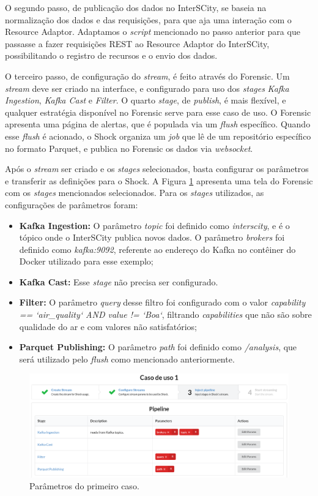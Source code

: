 O segundo passo, de publicação dos dados no InterSCity, se baseia na
normalização dos dados e das requisições, para que aja uma interação com o
Resource Adaptor. Adaptamos o \textit{script} mencionado no passo anterior
para que passasse a fazer requisições REST ao Resource Adaptor do InterSCity,
possibilitando o registro de recursos e o envio dos dados.

O terceiro passo, de configuração do \textit{stream}, é feito através do Forensic.
Um \textit{stream} deve ser criado na interface, e configurado para uso dos
\textit{stages} \textit{Kafka Ingestion}, \textit{Kafka Cast} e \textit{Filter}.
O quarto \textit{stage}, de \textit{publish}, é mais flexível, e qualquer
estratégia disponível no Forensic serve para esse caso de uso. O Forensic
apresenta uma página de alertas, que é populada via um \textit{flush}
específico. Quando esse \textit{flush} é acionado, o Shock organiza um \textit{job}
que lê de um repositório específico no formato Parquet, e publica no Forensic
os dados via \textit{websocket}.



Após o \textit{stream} ser criado e os \textit{stages} selecionados, basta
configurar os parâmetros e transferir as definições para o Shock. A Figura
\ref{fig:case1} apresenta uma tela do Forensic com os \textit{stages}
mencionados selecionados. Para os \textit{stages} utilizados, as
configurações de parâmetros foram:

\begin{itemize}
    \item \textbf{Kafka Ingestion:} O parâmetro \textit{topic} foi definido
        como \textit{interscity}, e é o tópico onde o InterSCity publica
        novos dados. O parâmetro \textit{brokers} foi definido como
        \textit{kafka:9092}, referente ao endereço do Kafka no contêiner do
        Docker utilizado para esse exemplo;
    \item \textbf{Kafka Cast:} Esse \textit{stage} não precisa ser configurado.
    \item \textbf{Filter:} O parâmetro \textit{query} desse filtro foi
        configurado com o valor \textit{capability == `air\_quality` AND value != `Boa`},
        filtrando \textit{capabilities} que não são sobre qualidade do ar e
        com valores não satisfatórios;
    \item \textbf{Parquet Publishing:} O parâmetro \textit{path} foi definido
        como \textit{/analysis}, que será utilizado pelo \textit{flush} como
        mencionado anteriormente.
\end{itemize}

\begin{figure}
  \centering
  \includegraphics[width=\textwidth]{figuras/parametros.png}
  \caption{Parâmetros do primeiro caso.}
  \label{fig:case1}
\end{figure}

